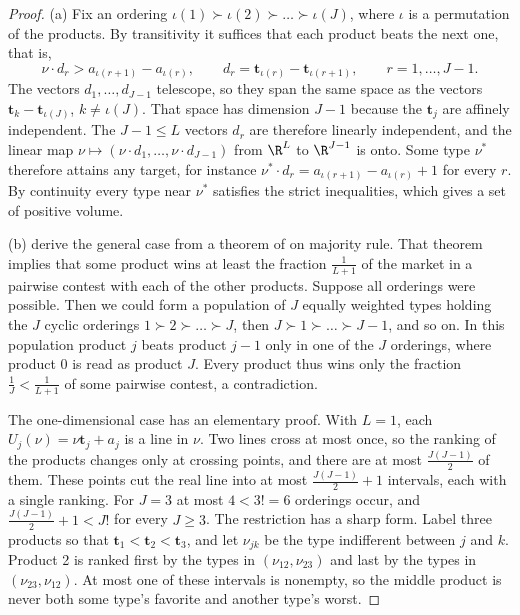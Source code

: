 \begin{proof}
(a) Fix an ordering $\iota(1) \succ \iota(2) \succ \dots \succ \iota(J)$, where $\iota$ is a permutation of the products.
By transitivity it suffices that each product beats the next one, that is,
\begin{equation*}
\nu \cdot d_r > a_{\iota(r+1)} - a_{\iota(r)}, \qquad d_r = \bm{t}_{\iota(r)} - \bm{t}_{\iota(r+1)}, \qquad r = 1, \dots, J - 1.
\end{equation*}
The vectors $d_1, \dots, d_{J-1}$ telescope, so they span the same space as the vectors $\bm{t}_k - \bm{t}_{\iota(J)}$,
$k \neq \iota(J)$. That space has dimension $J - 1$ because the $\bm{t}_j$ are affinely independent. The $J - 1 \leq L$
vectors $d_r$ are therefore linearly independent, and the linear map $\nu \mapsto (\nu \cdot d_1, \dots, \nu \cdot
d_{J-1})$ from $\R^L$ to $\R^{J-1}$ is onto. Some type $\nu^*$ therefore attains any target, for instance $\nu^*
\cdot d_r = a_{\iota(r+1)} - a_{\iota(r)} + 1$ for every $r$. By continuity every type near $\nu^*$ satisfies the strict
inequalities, which gives a set of positive volume.

(b) \citet{CaplinNalebuff1991} derive the general case from a theorem of \citet{Greenberg1979} on majority rule.
That theorem implies that some product wins at least the fraction $\frac{1}{L+1}$ of the market in a pairwise
contest with each of the other products. Suppose all orderings were possible. Then we could form a population of
$J$ equally weighted types holding the $J$ cyclic orderings $1 \succ 2 \succ \dots \succ J$, then $J \succ 1 \succ
\dots \succ J - 1$, and so on. In this population product $j$ beats product $j - 1$ only in one of the $J$
orderings, where product $0$ is read as product $J$. Every product thus wins only the fraction $\frac{1}{J} <
\frac{1}{L+1}$ of some pairwise contest, a contradiction.

The one-dimensional case has an elementary proof. With $L = 1$, each $U_j(\nu) = \nu\bm{t}_j + a_j$ is a line in
$\nu$. Two lines cross at most once, so the ranking of the products changes only at crossing points, and there are
at most $\frac{J(J-1)}{2}$ of them. These points cut the real line into at most $\frac{J(J-1)}{2} + 1$ intervals, each with a single
ranking. For $J = 3$ at most $4 < 3! = 6$ orderings occur, and $\frac{J(J-1)}{2} + 1 < J!$ for every $J \geq 3$.
The restriction has a sharp form. Label three products so that $\bm{t}_1 < \bm{t}_2 < \bm{t}_3$, and let $\nu_{jk}$ be
the type indifferent between $j$ and $k$. Product 2 is ranked first by the types in $(\nu_{12}, \nu_{23})$ and last
by the types in $(\nu_{23}, \nu_{12})$. At most one of these intervals is nonempty, so the middle product is never
both some type's favorite and another type's worst.
\end{proof}

